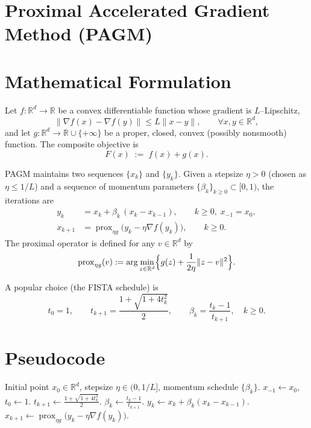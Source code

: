\documentclass{article}
\newcommand{\prox}{\operatorname{prox}}
\newcommand{\R}{\mathbb{R}}
\begin{document}
\section*{Proximal Accelerated Gradient Method (PAGM)}

\section*{Mathematical Formulation}
Let $f:\R^{d}\rightarrow \R$ be a convex differentiable function whose gradient is $L$–Lipschitz,
\[
\|\nabla f(x)-\nabla f(y)\|\le L\|x-y\|,\qquad\forall x,y\in\R^{d},
\]
and let $g:\R^{d}\rightarrow\R\cup\{+\infty\}$ be a proper, closed, convex (possibly nonsmooth) function.
The composite objective is
\[
F(x)\;:=\;f(x)+g(x).
\]

PAGM maintains two sequences $\{x_k\}$ and $\{y_k\}$.
Given a stepsize $\eta>0$ (chosen as $\eta\le 1/L$) and a sequence of momentum parameters
$\{\beta_k\}_{k\ge 0}\subset[0,1)$, the iterations are
\begin{align}
y_k &= x_k+\beta_k\,(x_k-x_{k-1}), \qquad k\ge 0,\; x_{-1}=x_0, \label{eq:y}\\
x_{k+1}&=\prox_{\eta g}\!\bigl(y_k-\eta \nabla f(y_k)\bigr), \qquad k\ge 0. \label{eq:x}
\end{align}
The proximal operator is defined for any $v\in\R^{d}$ by
\[
\prox_{\eta g}(v):=\arg\min_{z\in\R^{d}}\Bigl\{g(z)+\frac{1}{2\eta}\|z-v\|^{2}\Bigr\}.
\]

A popular choice (the FISTA schedule) is
\[
t_{0}=1,\qquad 
t_{k+1}=\frac{1+\sqrt{1+4t_{k}^{2}}}{2},\qquad 
\beta_k=\frac{t_{k}-1}{t_{k+1}},\quad k\ge0.
\]

\section*{Pseudocode}
\begin{algorithm}[H]
\caption{Proximal Accelerated Gradient Method (PAGM)}
\begin{algorithmic}[1]
\Require Initial point $x_{0}\in\R^{d}$, stepsize $\eta\in(0,1/L]$, momentum schedule $\{\beta_k\}$.
\State $x_{-1}\gets x_{0}$,\; $t_{0}\gets1$.
    \State $t_{k+1}\gets\frac{1+\sqrt{1+4t_{k}^{2}}}{2}$.
    \State $\beta_{k}\gets\frac{t_{k}-1}{t_{k+1}}$.
    \State $y_{k}\gets x_{k}+\beta_{k}(x_{k}-x_{k-1})$.\label{line:y}
    \State $x_{k+1}\gets\prox_{\eta g}\!\bigl(y_{k}-\eta \nabla f(y_{k})\bigr)$.\label{line:x}
\EndFor
\end{algorithmic}
\end{algorithm}
\end{document}
